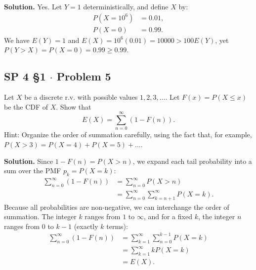 \documentclass[11pt,a4paper]{article}
\begin{document}
\noindent \textbf{Solution.} Yes. Let $Y = 1$ deterministically, and define $X$ by:
\begin{align*}
P(X = 10^6) &= 0.01, \\
P(X = 0) &= 0.99.
\end{align*}
We have $E(Y) = 1$ and $E(X) = 10^6(0.01) = 10000 > 100 E(Y)$, yet $P(Y > X) = P(X = 0) = 0.99 \ge 0.99$.

\vspace{10pt}
\subsection{SP 4 \S1 $\cdot$ Problem 5}
\begin{tcolorbox}[title={SP 4 \S1 $\cdot$ Problem 5}]
Let $X$ be a discrete r.v. with possible values $1, 2, 3, \dots$. Let $F(x) = P(X \le x)$ be the CDF of $X$. Show that
\[
E(X) = \sum_{n=0}^{\infty} (1 - F(n)).
\]
Hint: Organize the order of summation carefully, using the fact that, for example, $P(X > 3) = P(X = 4) + P(X = 5) + \dots$.
\end{tcolorbox}

\noindent \textbf{Solution.} Since $1 - F(n) = P(X > n)$, we expand each tail probability into a sum over the PMF $p_k = P(X = k)$:
\begin{align*}
\sum_{n=0}^{\infty} (1 - F(n)) &= \sum_{n=0}^{\infty} P(X > n) \\
&= \sum_{n=0}^{\infty} \sum_{k=n+1}^{\infty} P(X = k).
\end{align*}
Because all probabilities are non-negative, we can interchange the order of summation. The integer $k$ ranges from $1$ to $\infty$, and for a fixed $k$, the integer $n$ ranges from $0$ to $k-1$ (exactly $k$ terms):
\begin{align*}
\sum_{n=0}^{\infty} (1 - F(n)) &= \sum_{k=1}^{\infty} \sum_{n=0}^{k-1} P(X = k) \\
&= \sum_{k=1}^{\infty} k P(X = k) \\
&= E(X).
\end{align*}

\vspace{10pt}
\end{document}
